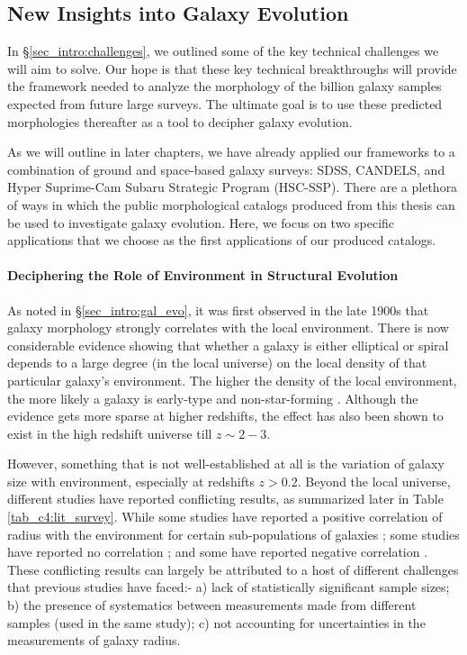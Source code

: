 \subsection{New Insights into Galaxy Evolution} \label{sec_intro:gal_evo_opportunities}

In \S \ref{sec_intro:challenges}, we outlined some of the key technical challenges we will aim to solve. Our hope is that these key technical breakthroughs will provide the framework needed to analyze the morphology of the billion galaxy samples expected from future large surveys. The ultimate goal is to use these predicted morphologies thereafter as a tool to decipher galaxy evolution. 

As we will outline in later chapters, we have already applied our frameworks to a combination of ground and space-based galaxy surveys: SDSS, CANDELS, and Hyper Suprime-Cam Subaru Strategic Program (HSC-SSP). There are a plethora of ways in which the public morphological catalogs produced from this thesis can be used to investigate galaxy evolution. Here, we focus on two specific applications that we choose as the first applications of our produced catalogs. 

\paragraph{Deciphering the Role of Environment in Structural Evolution} As noted in \S \ref{sec_intro:gal_evo}, it was first observed in the late 1900s that galaxy morphology strongly correlates with the local environment. There is now considerable evidence showing that whether a galaxy is either elliptical or spiral depends to a large degree (in
the local universe) on the local density of that particular galaxy’s environment. The higher the density of the local environment, the more likely a galaxy is early-type and non-star-forming \citep[e.g.,][]{dressler_84, gomez_03, blanton_09}. Although the evidence gets more sparse at higher redshifts, the effect has also been shown to exist in the high redshift universe till $z\sim2-3$.

However, something that is not well-established at all is the variation of galaxy size with environment, especially at redshifts $z > 0.2$. Beyond the local universe, different studies have reported conflicting results, as summarized later in Table \ref{tab_c4:lit_survey}. While some studies have reported a positive correlation of radius with the environment for certain sub-populations of galaxies \citep[e.g.,][]{Cooper12,Lani13,Bassett13,Afonso19,Siudek22}; some studies have reported no correlation \citep[e.g.,][]{Huertas-Company13,Kelkar15,Gu21}; and some have reported negative correlation \citep[e.g.,][]{Matharu19,Chan18}. These conflicting results can largely be attributed to a host of different challenges that previous studies have faced:- a) lack of statistically significant sample sizes; b) the presence of systematics between measurements made from different samples (used in the same study);  c) not accounting for uncertainties in the measurements of galaxy radius. 

